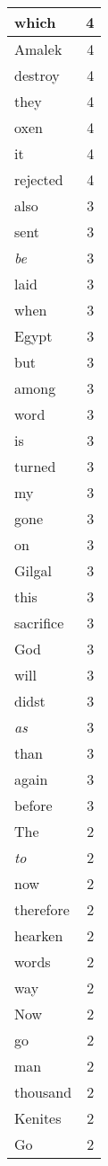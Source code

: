 \begin{center}
\begin{longtable}{l|r}
which & 4 \\ \hline
Amalek & 4 \\ \hline
destroy & 4 \\ \hline
they & 4 \\ \hline
oxen & 4 \\ \hline
it & 4 \\ \hline
rejected & 4 \\ \hline
also & 3 \\ \hline
sent & 3 \\ \hline
\emph{be} & 3 \\ \hline
laid & 3 \\ \hline
when & 3 \\ \hline
Egypt & 3 \\ \hline
but & 3 \\ \hline
among & 3 \\ \hline
word & 3 \\ \hline
is & 3 \\ \hline
turned & 3 \\ \hline
my & 3 \\ \hline
gone & 3 \\ \hline
on & 3 \\ \hline
Gilgal & 3 \\ \hline
this & 3 \\ \hline
sacrifice & 3 \\ \hline
God & 3 \\ \hline
will & 3 \\ \hline
didst & 3 \\ \hline
\emph{as} & 3 \\ \hline
than & 3 \\ \hline
again & 3 \\ \hline
before & 3 \\ \hline
The & 2 \\ \hline
\emph{to} & 2 \\ \hline
now & 2 \\ \hline
therefore & 2 \\ \hline
hearken & 2 \\ \hline
words & 2 \\ \hline
way & 2 \\ \hline
Now & 2 \\ \hline
go & 2 \\ \hline
man & 2 \\ \hline
thousand & 2 \\ \hline
Kenites & 2 \\ \hline
Go & 2 \\ \hline

\end{longtable}
\end{center}
